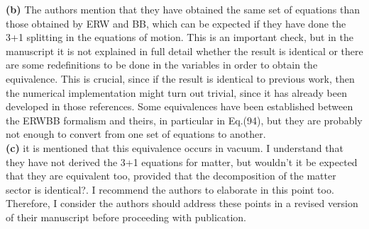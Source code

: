 \documentclass[3p,times]{article}
\begin{document}
\noindent
\textbf{(b)} The authors mention that they have obtained the same set of equations than
those obtained by ERW and BB, which can be expected if they have done the 3+1
splitting in the equations of motion. This is an important check, but in the
manuscript it is not explained in full detail whether the result is identical or
there are some redefinitions to be done in the variables in order to obtain the
equivalence. This is crucial, since if the result is identical to previous work,
then the numerical implementation might turn out trivial, since it has already
been developed in those references. Some equivalences have been established
between the ERWBB formalism and theirs, in particular in Eq.(94), but they are
probably not enough to convert from one set of equations to another.
\\

\noindent
\textbf{(c)} it is mentioned that this equivalence occurs in vacuum. I understand that
they have not derived the 3+1 equations for matter, but wouldn't it be expected
that they are equivalent too, provided that the decomposition of the matter
sector is identical?. I recommend the authors to elaborate in this point too.
\\

\noindent
Therefore, I consider the authors should address these points in a revised
version of their manuscript before proceeding with publication.
\end{document}
